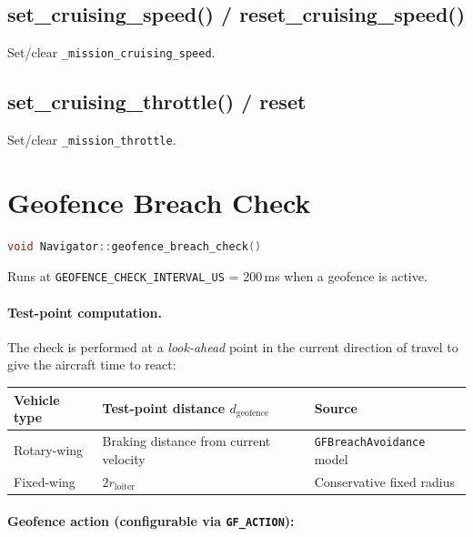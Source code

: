 \documentclass[12pt,a4paper]{article}
\begin{document}
\subsection{set\_cruising\_speed() / reset\_cruising\_speed()}
Set/clear \texttt{\_mission\_cruising\_speed}.

\subsection{set\_cruising\_throttle() / reset}
Set/clear \texttt{\_mission\_throttle}.

\section{Geofence Breach Check}
\label{sec:geofence}

\begin{lstlisting}[language=C++]
void Navigator::geofence_breach_check()
\end{lstlisting}

Runs at \texttt{GEOFENCE\_CHECK\_INTERVAL\_US} = 200\,ms when a geofence is active.

\paragraph{Test-point computation.}

The check is performed at a \emph{look-ahead} point in the current direction of
travel to give the aircraft time to react:

\begin{center}\begin{tabular}{lll}\toprule
Vehicle type & Test-point distance $d_{\text{geofence}}$ & Source \\\midrule
Rotary-wing & Braking distance from current velocity & \texttt{GFBreachAvoidance} model \\
Fixed-wing & $2 r_{\text{loiter}}$ & Conservative fixed radius \\
\bottomrule\end{tabular}\end{center}

\paragraph{Geofence action (configurable via \texttt{GF\_ACTION}):}
\end{document}
